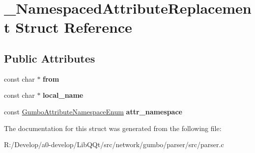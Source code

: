 \hypertarget{struct___namespaced_attribute_replacement}{}\section{\+\_\+\+Namespaced\+Attribute\+Replacement Struct Reference}
\label{struct___namespaced_attribute_replacement}
\subsection*{Public Attributes}
\begin{DoxyCompactItemize}
\item 
\mbox{\label{struct___namespaced_attribute_replacement_a8e13b99a492a407864fdb90ed3f0166b}} 
const char $\ast$ {\bfseries from}
\item 
\mbox{\label{struct___namespaced_attribute_replacement_a983dac5c3c327aa246c09013895cc143}} 
const char $\ast$ {\bfseries local\+\_\+name}
\item 
\mbox{\label{struct___namespaced_attribute_replacement_a81b92a376eb9e2d6dd178bf791bf6109}} 
const \mbox{\hyperlink{gumbo_8h_a030699170924efadb11b8e43a8681852}{Gumbo\+Attribute\+Namespace\+Enum}} {\bfseries attr\+\_\+namespace}
\end{DoxyCompactItemize}


The documentation for this struct was generated from the following file\+:\begin{DoxyCompactItemize}
\item 
R\+:/\+Develop/a0-\/develop/\+Lib\+Q\+Qt/src/network/gumbo/parser/src/parser.\+c\end{DoxyCompactItemize}
